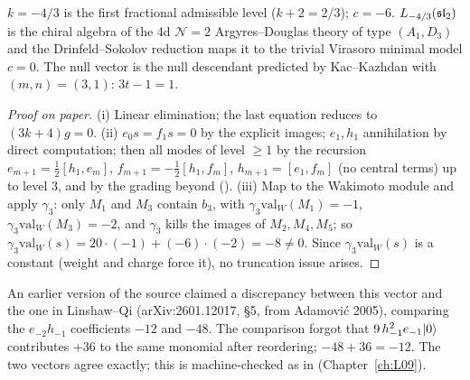 \begin{physics}
$k=-4/3$ is the first fractional admissible level ($k+2 = 2/3$); $c=-6$. $L_{-4/3}(\mathfrak{sl}_2)$ is the
chiral algebra of the 4d $\mathcal N=2$ Argyres--Douglas theory of type $(A_1,D_3)$ and the
Drinfeld--Sokolov reduction maps it to the trivial Virasoro minimal model $c=0$. The null vector is
the null descendant predicted by Kac--Kazhdan with $(m,n)=(3,1)$: $3t-1 = 1$.
\end{physics}

\begin{proof}[Proof on paper]
(i) Linear elimination; the last equation reduces to $(3k+4)g=0$. (ii) $e_0s=f_1s=0$ by the explicit
images; $e_1,h_1$ annihilation by direct computation; then all modes of level $\ge1$ by the recursion
$e_{m+1} = \frac12[h_1,e_m]$, $f_{m+1}=-\frac12[h_1,f_m]$, $h_{m+1}=[e_1,f_m]$ (no central terms) up to
level $3$, and by the grading beyond (). (iii) Map to the Wakimoto module and apply
$\gamma_3$: only $M_1$ and $M_3$ contain $b_3$, with $\gamma_3\mathrm{val}_W(M_1) = -1$,
$\gamma_3\mathrm{val}_W(M_3) = -2$, and $\gamma_3$ kills the images of $M_2,M_4,M_5$; so
$\gamma_3\mathrm{val}_W(s) = 20\cdot(-1) + (-6)\cdot(-2) = -8\ne0$. Since $\gamma_3\mathrm{val}_W(s)$ is a constant (weight and charge
force it), no truncation issue arises.
\end{proof}

\begin{warning}[title={Corrected false alarm: agreement with Linshaw--Qi}]
An earlier version of the source claimed a discrepancy between this vector and the one in
Linshaw--Qi (arXiv:2601.12017, \S5, from Adamovi\'c 2005), comparing the $e_{-2}h_{-1}$ coefficients
$-12$ and $-48$. The comparison forgot that $9\,h_{-1}^2e_{-1}|0\rangle$ contributes $+36$ to the same
monomial after reordering; $-48+36=-12$. The two vectors agree exactly; this is machine-checked as
 in  (Chapter~\ref{ch:L09}).
\end{warning}

